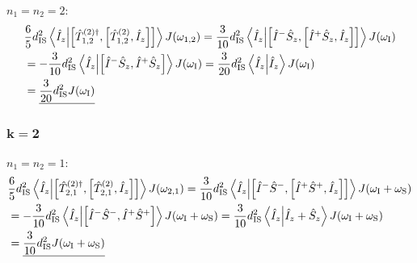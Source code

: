\begin{appendixtext}
$n_1 = n_2 = 2$:
\begin{align*}
&\frac{6}{5} d_{\text{IS}}^2 \bra{\hat{I}_z} \ket{\comm{\hat{T}_{1, 2}^{(2) \dagger}}{\comm{\hat{T}_{1,2}^{(2)}}{\hat{I}_z}}} J(\omega_{1,2}) = \frac{3}{10} d_{\text{IS}}^2 \bra{\hat{I}_z} \ket{\comm{\hat{I}^- \hat{S}_z}{\comm{\hat{I}^+ \hat{S}_z}{\hat{I}_z}}} J(\omega_{\text{I}}) \\
&= -\frac{3}{10} d_{\text{IS}}^2 \bra{\hat{I}_z} \ket{\comm{\hat{I}^- \hat{S}_z}{\hat{I}^+ \hat{S}_z}} J(\omega_{\text{I}}) = \frac{3}{20} d_{\text{IS}}^2 \bra{\hat{I}_z} \ket{\hat{I}_z} J(\omega_{\text{I}}) \\
&= \underline{\frac{3}{20} d_{\text{IS}}^2 J(\omega_{\text{I}})}
\end{align*}
\subsubsection{$\mathbf{k = 2}$}
$n_1 = n_2 = 1$:
\begin{align*}
&\frac{6}{5} d_{\text{IS}}^2 \bra{\hat{I}_z} \ket{\comm{\hat{T}_{2, 1}^{(2) \dagger}}{\comm{\hat{T}_{2,1}^{(2)}}{\hat{I}_z}}} J(\omega_{2,1}) = \frac{3}{10} d_{\text{IS}}^2 \bra{\hat{I}_z} \ket{\comm{\hat{I}^- \hat{S}^-}{\comm{\hat{I}^+ \hat{S}^+}{\hat{I}_z}}} J(\omega_{\text{I}} + \omega_{\text{S}}) \\
&= -\frac{3}{10} d_{\text{IS}}^2 \bra{\hat{I}_z} \ket{\comm{\hat{I}^- \hat{S}^-}{\hat{I}^+ \hat{S}^+}} J(\omega_{\text{I}} + \omega_{\text{S}}) = \frac{3}{10} d_{\text{IS}}^2 \bra{\hat{I}_z} \ket{\hat{I}_z + \hat{S}_z} J(\omega_{\text{I}} + \omega_{\text{S}}) \\
& = \underline{\frac{3}{10} d_{\text{IS}}^2 J(\omega_{\text{I}} + \omega_{\text{S}})}
\end{align*}

\end{appendixtext}
